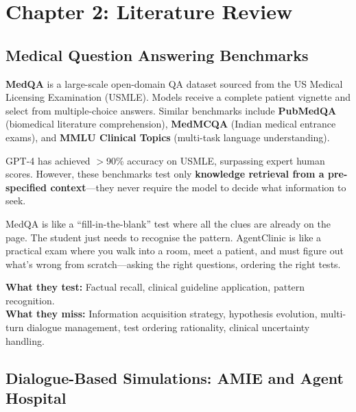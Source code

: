 \section{Chapter 2: Literature Review}
\label{ch:litreview}

\subsection{Medical Question Answering Benchmarks}

\begin{acadbox}[\textcolor{white}{Academic Definition}]
\textbf{MedQA} is a large-scale open-domain QA dataset sourced from the US Medical Licensing Examination (USMLE). Models receive a complete patient vignette and select from multiple-choice answers. Similar benchmarks include \textbf{PubMedQA} (biomedical literature comprehension), \textbf{MedMCQA} (Indian medical entrance exams), and \textbf{MMLU Clinical Topics} (multi-task language understanding).

GPT-4 has achieved $>$90\% accuracy on USMLE, surpassing expert human scores. However, these benchmarks test only \textbf{knowledge retrieval from a pre-specified context}---they never require the model to decide what information to seek.
\end{acadbox}

\begin{analogybox}[\textcolor{white}{Simple Analogy}]
MedQA is like a ``fill-in-the-blank'' test where all the clues are already on the page. The student just needs to recognise the pattern. AgentClinic is like a practical exam where you walk into a room, meet a patient, and must figure out what's wrong from scratch---asking the right questions, ordering the right tests.
\end{analogybox}

\textbf{What they test:} Factual recall, clinical guideline application, pattern recognition.\\
\textbf{What they miss:} Information acquisition strategy, hypothesis evolution, multi-turn dialogue management, test ordering rationality, clinical uncertainty handling.

\subsection{Dialogue-Based Simulations: AMIE and Agent Hospital}

